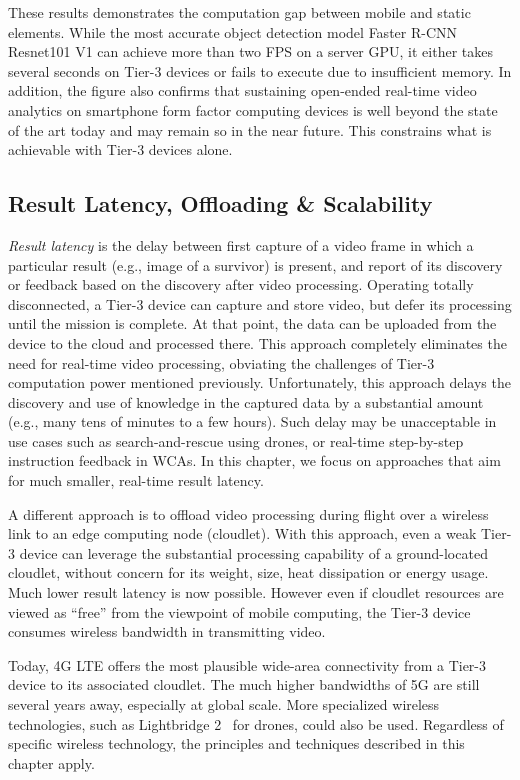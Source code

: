 These results demonstrates the computation gap between mobile and static
elements. While the most accurate object detection model Faster R-CNN Resnet101
V1 can achieve more than two FPS on a server GPU, it either takes several
seconds on Tier-3 devices or fails to execute due to insufficient memory. In
addition, the figure also confirms that sustaining open-ended real-time video
analytics on smartphone form factor computing devices is well beyond the state
of the art today and may remain so in the near future.  This constrains what is
achievable with Tier-3 devices alone.

\subsection{Result Latency, Offloading \& Scalability}
\label{bw:offloading}

{\em Result latency} is the delay between first capture of a video frame in
which a particular result (e.g., image of a survivor) is present, and report of
its discovery or feedback based on the discovery after video processing.
Operating totally disconnected, a Tier-3 device can capture and store video, but
defer its processing until the mission is complete.  At that point, the data can
be uploaded from the device to the cloud and processed there.  This approach
completely eliminates the need for real-time video processing, obviating the
challenges of Tier-3 computation power mentioned previously. Unfortunately, this
approach delays the discovery and use of knowledge in the captured data by a
substantial amount (e.g., many tens of minutes to a few hours).  Such delay may
be unacceptable in use cases such as search-and-rescue using drones, or
real-time step-by-step instruction feedback in WCAs. In this chapter, we focus
on approaches that aim for much smaller, real-time result latency.

A different approach is to offload video processing during flight over a
wireless link to an edge computing node (cloudlet). With this approach, even a
weak Tier-3 device can leverage the substantial processing capability of a
ground-located cloudlet, without concern for its weight, size, heat dissipation
or energy usage.  Much lower result latency is now possible.  However even if
cloudlet resources are viewed as ``free'' from the viewpoint of mobile
computing, the Tier-3 device consumes wireless bandwidth in transmitting video.

Today, 4G LTE offers the most plausible wide-area connectivity from a Tier-3
device to its associated cloudlet. The much higher bandwidths of 5G are still
several years away, especially at global scale.  More specialized wireless
technologies, such as Lightbridge 2~\cite{LightBridge2} for drones, could also
be used. Regardless of specific wireless technology, the principles and
techniques described in this chapter apply.

